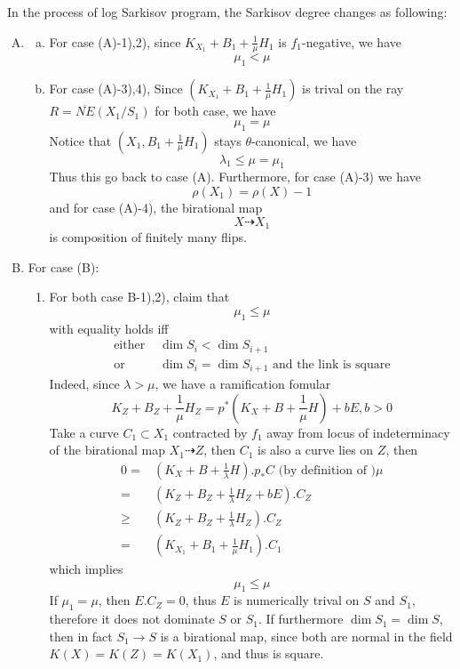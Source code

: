 \documentclass{article}
\begin{document}
In the process of log Sarkisov program, the Sarkisov degree changes as following:
\begin{enumerate}[(A)]
\item
\begin{enumerate}[a)]
\item For case (A)-1),2),  since $ K_{X_1}+B_1+\frac{1}{\mu}H_1 $ is $ f_1 $-negative, we have
$$ \mu_1<\mu $$
\item For case (A)-3),4), Since $ (K_{X_1}+B_1+\frac{1}{\mu}H_1) $ is trival on the ray $ R=\overline{NE}(X_1/S_1) $ for both case, we have
$$ \mu_1=\mu $$
Notice that $ (X_1,B_1+\frac{1}{\mu}H_1) $ stays $ \theta $-canonical, we have
$$ \lambda_1\leqslant \mu=\mu_1 $$
Thus this go back to case (A). Furthermore,   for case (A)-3) we have
$$ \rho(X_1)=\rho(X)-1 $$
and for case (A)-4), the birational map
$$ X\dashrightarrow X_1 $$
is composition of finitely many flips.
\end{enumerate}
\item For case (B):
\begin{enumerate}[1)]
\item For both case B-1),2), claim that
$$ \mu_1\leqslant \mu $$
with equality holds iff
\begin{equation*}
\begin{aligned}
\text{either } &\dim S_i<\dim S_{i+1} \\
\text{or }&\dim S_i=\dim S_{i+1} \text{ and the link is square}
\end{aligned}
\end{equation*}
Indeed, since $ \lambda>\mu $, we have a ramification fomular
$$ K_Z+B_Z+\frac{1}{\mu}H_Z=p^*(K_X+B+\frac{1}{\mu}H)+bE, b>0 $$
Take a curve $ C_1\subset X_1 $ contracted by $ f_1 $ away from locus of indeterminacy of the birational map $ X_1\dashrightarrow Z $, then $ C_1 $ is also a curve lies on $ Z $, then
\begin{equation*}
\begin{aligned}
0=& (K_{X}+B+\frac{1}{\lambda}H).p_*C \text{ (by definition of )} \mu\\
=&(K_{Z}+B_{Z}+\frac{1}{\lambda}H_Z+bE).C_{Z}\\
\geqslant&(K_Z+B_Z+\frac{1}{\lambda}H_Z).C_Z\\
=&(K_{X_1}+B_1+\frac{1}{\mu}H_1).C_1
\end{aligned}
\end{equation*}
which implies
$$ \mu_1\leqslant \mu $$
If $ \mu_1=\mu $, then $ E.C_Z=0 $, thus $ E $ is numerically trival on $ S $ and $ S_1 $, therefore it  does not dominate $ S $ or $ S_1 $. If furthermore $ \dim S_1=\dim S $, then in fact $  S_1\to S  $ is a birational map, since both are normal in the field $ K(X)=K(Z)=K(X_1) $, and thus is square.

\end{enumerate}
\end{enumerate}
\end{document}
